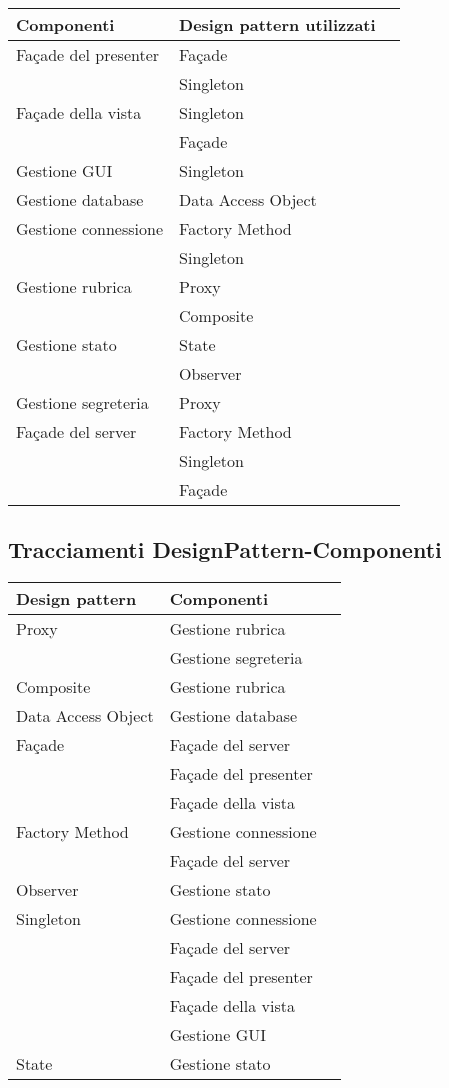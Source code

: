 \begin{center}
\begin{longtable}{lp{}l}
\toprule Componenti & Design pattern utilizzati\\
\midrule
Façade del presenter & Façade \\
 & Singleton \\
Façade della vista & Singleton \\
 & Façade \\
Gestione GUI & Singleton \\
Gestione database & Data Access Object \\
Gestione connessione & Factory Method \\
 & Singleton \\
Gestione rubrica & Proxy \\
 & Composite \\
Gestione stato & State \\
 & Observer \\
Gestione segreteria & Proxy \\
Façade del server & Factory Method \\
 & Singleton \\
 & Façade \\
\bottomrule
\end{longtable}
\end{center}
\subsection{Tracciamenti DesignPattern-Componenti}\label{sec:tracDpComp}

\begin{center}
\begin{longtable}{lp{}l}
\toprule Design pattern & Componenti\\
\midrule
Proxy & Gestione rubrica \\
 & Gestione segreteria \\
Composite & Gestione rubrica \\
Data Access Object & Gestione database \\
Façade & Façade del server \\
 & Façade del presenter \\
 & Façade della vista \\
Factory Method & Gestione connessione \\
 & Façade del server \\
Observer & Gestione stato \\
Singleton & Gestione connessione \\
 & Façade del server \\
 & Façade del presenter \\
 & Façade della vista \\
 & Gestione GUI \\
State & Gestione stato \\
\bottomrule
\end{longtable}
\end{center}

